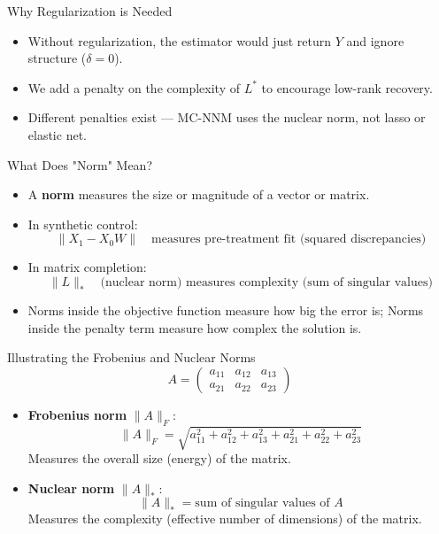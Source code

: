 \documentclass{beamer}
\begin{document}
\begin{frame}{Why Regularization is Needed}
\small
\begin{itemize}
\item Without regularization, the estimator would just return $Y$ and ignore structure ($\delta = 0$).
\item We add a penalty on the complexity of $L^*$ to encourage low-rank recovery.
\item Different penalties exist — MC-NNM uses the nuclear norm, not lasso or elastic net.
\end{itemize}
\end{frame}


\begin{frame}{What Does "Norm" Mean?}
\small
\begin{itemize}
  \item A \textbf{norm} measures the size or magnitude of a vector or matrix.
  \item In synthetic control:
  \[
  \|X_1 - X_0 W\| \quad \text{measures pre-treatment fit (squared discrepancies)}
  \]
  \item In matrix completion:
  \[
  \|L\|_* \quad \text{(nuclear norm) measures complexity (sum of singular values)}
  \]
  \item Norms inside the objective function measure how big the error is;
  Norms inside the penalty term measure how complex the solution is.
\end{itemize}
\end{frame}

\begin{frame}{Illustrating the Frobenius and Nuclear Norms}
\small
\[
A = \begin{pmatrix}
a_{11} & a_{12} & a_{13} \\
a_{21} & a_{22} & a_{23}
\end{pmatrix}
\]

\bigskip

\begin{itemize}
  \item \textbf{Frobenius norm} $\|A\|_F$:
  \[
  \|A\|_F = \sqrt{a_{11}^2 + a_{12}^2 + a_{13}^2 + a_{21}^2 + a_{22}^2 + a_{23}^2}
  \]
  Measures the overall size (energy) of the matrix.
  
  \item \textbf{Nuclear norm} $\|A\|_*$:
  \[
  \|A\|_* = \text{sum of singular values of } A
  \]
  Measures the complexity (effective number of dimensions) of the matrix.
\end{itemize}
\end{frame}
\end{document}
